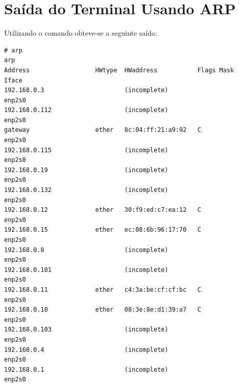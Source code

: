 \documentclass[12pt,a4paper]{report}
\begin{document}
\section{Saída do Terminal Usando ARP}

Utilizando o comando  obteve-se a seguinte saída:

\begin{lstlisting}[style=BStyle]
# arp
arp
Address                  HWtype  HWaddress           Flags Mask            Iface
192.168.0.3                      (incomplete)                              enp2s0
192.168.0.112                    (incomplete)                              enp2s0
gateway                  ether   8c:04:ff:21:a9:92   C                     enp2s0
192.168.0.115                    (incomplete)                              enp2s0
192.168.0.19                     (incomplete)                              enp2s0
192.168.0.132                    (incomplete)                              enp2s0
192.168.0.12             ether   30:f9:ed:c7:ea:12   C                     enp2s0
192.168.0.15             ether   ec:08:6b:96:17:70   C                     enp2s0
192.168.0.8                      (incomplete)                              enp2s0
192.168.0.101                    (incomplete)                              enp2s0
192.168.0.11             ether   c4:3a:be:cf:cf:bc   C                     enp2s0
192.168.0.10             ether   08:3e:8e:d1:39:a7   C                     enp2s0
192.168.0.103                    (incomplete)                              enp2s0
192.168.0.4                      (incomplete)                              enp2s0
192.168.0.1                      (incomplete)                              enp2s0

\end{lstlisting}
\end{document}
